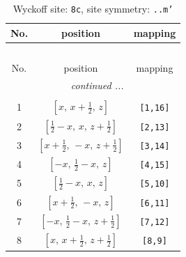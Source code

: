 \documentclass[fleqn,8pt]{jsarticle}
\begin{document}
\renewcommand{\arraystretch}{1.2}
\begin{longtable}{ccc}
\caption{Wyckoff site: {\tt 8c}, site symmetry: {\tt ..m'}}
 \\
 \hline \hline
No. & position & mapping \\ \hline \endfirsthead

\multicolumn{2}{l}{\tablename\ \thetable{}} \\
 \hline \hline
No. & position & mapping \\ \hline \endhead

 \hline \hline
\multicolumn{2}{r}{\footnotesize\it continued ...} \\ \endfoot

 \hline \hline
\multicolumn{2}{r}{} \\ \endlastfoot

1 & $\left[ x,\, x + \frac{1}{2},\, z \right]$ & {\tt [1,16]} \\ \hline
2 & $\left[ \frac{1}{2} - x,\, x,\, z + \frac{1}{2} \right]$ & {\tt [2,13]} \\ \hline
3 & $\left[ x + \frac{1}{2},\, - x,\, z + \frac{1}{2} \right]$ & {\tt [3,14]} \\ \hline
4 & $\left[ - x,\, \frac{1}{2} - x,\, z \right]$ & {\tt [4,15]} \\ \hline
5 & $\left[ \frac{1}{2} - x,\, x,\, z \right]$ & {\tt [5,10]} \\ \hline
6 & $\left[ x + \frac{1}{2},\, - x,\, z \right]$ & {\tt [6,11]} \\ \hline
7 & $\left[ - x,\, \frac{1}{2} - x,\, z + \frac{1}{2} \right]$ & {\tt [7,12]} \\ \hline
8 & $\left[ x,\, x + \frac{1}{2},\, z + \frac{1}{2} \right]$ & {\tt [8,9]} \\
\end{longtable}
\renewcommand{\arraystretch}{1.2}
\end{document}
